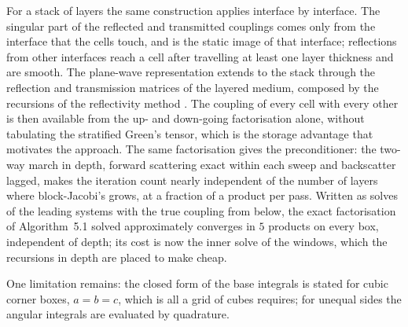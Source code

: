 \documentclass[11pt,a4paper]{article}
\begin{document}
For a stack of layers the same construction applies interface by interface. The singular part of the
reflected and transmitted couplings comes only from the interface that the cells touch, and is the static
image of that interface; reflections from other interfaces reach a cell after travelling at least one layer
thickness and are smooth. The plane-wave representation extends to the stack through the reflection and
transmission matrices of the layered medium, composed by the recursions of the reflectivity method
\citep{FuchsMuller1971,Kennett1983}. The coupling of every cell with every other is then available from the
up- and down-going factorisation alone, without tabulating the stratified Green's tensor, which is the
storage advantage that motivates the approach. The same factorisation gives the preconditioner: the two-way march
in depth, forward scattering exact within each sweep and backscatter lagged, makes the iteration count nearly
independent of the number of layers where block-Jacobi's grows, at a fraction of a product per pass. Written as
solves of the leading systems with the true coupling from below, the exact factorisation of Algorithm~5.1 solved
approximately converges in $5$ products on every box, independent of depth; its cost is now the inner solve of
the windows, which the recursions in depth are placed to make cheap.

One limitation remains: the closed form of the base integrals is stated for cubic corner boxes, $a=b=c$,
which is all a grid of cubes requires; for unequal sides the angular integrals are evaluated by quadrature.
\end{document}
